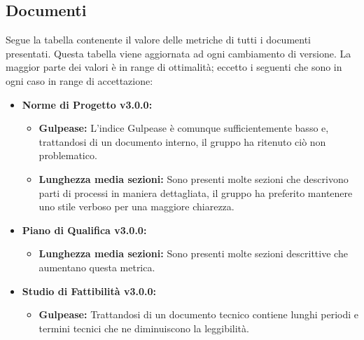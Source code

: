 \documentclass[a4paper]{article}
\begin{document}
			\subsection{Documenti}
			Segue la tabella contenente il valore delle metriche di tutti i documenti presentati. Questa tabella viene aggiornata ad ogni cambiamento di versione. La maggior parte dei valori è in range di ottimalità; eccetto i seguenti che sono in ogni caso in range di accettazione: \\
\begin{itemize}
	\item \textbf{Norme di Progetto v3.0.0:}
		\begin{itemize}
			\item \textbf{Gulpease:} L'indice Gulpease è comunque sufficientemente basso e, trattandosi di un documento interno, il gruppo ha ritenuto ciò non problematico.
			\item \textbf{Lunghezza media sezioni:} Sono presenti molte sezioni che descrivono parti di processi in maniera dettagliata, il gruppo ha preferito mantenere uno stile verboso per una maggiore chiarezza.
		\end{itemize}
	\item \textbf{Piano di Qualifica v3.0.0:}
		\begin{itemize}
			\item \textbf{Lunghezza media sezioni:} Sono presenti molte sezioni descrittive che aumentano questa metrica.
		\end{itemize}
	\item \textbf{Studio di Fattibilità v3.0.0:}
	\begin{itemize}
		\item \textbf{Gulpease:} Trattandosi di un documento tecnico contiene lunghi periodi e termini tecnici che ne diminuiscono la leggibilità.
	\end{itemize}
\end{itemize}
\end{document}
